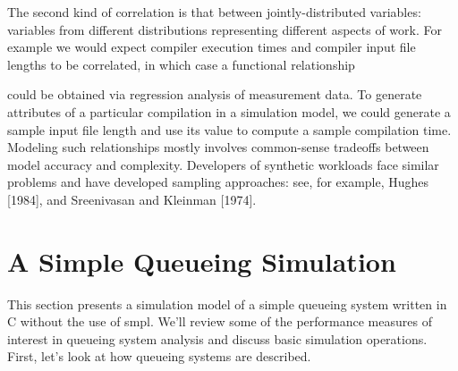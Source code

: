 The second kind of correlation is that between jointly-distributed variables:
variables from different distributions representing different aspects of work.
For example we would expect compiler execution times and compiler input file
lengths to be correlated, in which case a functional relationship

\noindent could be obtained via regression analysis of measurement data. To generate
attributes of a particular compilation in a simulation model, we could
generate a sample input file length and use its value to compute a sample
compilation time. Modeling such relationships mostly involves common-sense
tradeoffs between model accuracy and complexity. Developers of synthetic
workloads face similar problems and have developed sampling approaches: see,
for example, Hughes [1984], and Sreenivasan and Kleinman [1974].

\section{A Simple Queueing Simulation}
\label{sec:simple-queueing-sim}
This section presents a simulation model of a simple queueing system written in
C without the use of smpl. We'll review some of the performance measures of
interest in queueing system analysis and discuss basic simulation operations.
First, let's look at how queueing systems are described.

